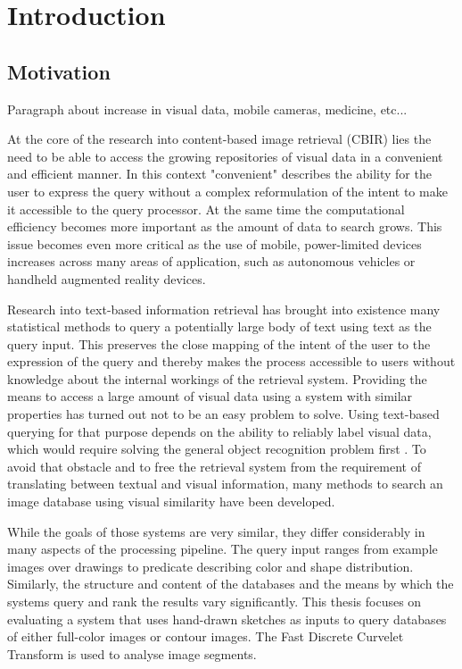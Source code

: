 \chapter{Introduction}\label{ch:introduction}

\section{Motivation}

Paragraph about increase in visual data, mobile cameras, medicine, etc...

At the core of the research into content-based image retrieval (CBIR) lies the
need to be able to access the growing repositories of visual data in a
convenient and efficient manner.  In this context "convenient" describes the
ability for the user to express the query without a complex reformulation of
the intent to make it accessible to the query processor. At the same time the
computational efficiency becomes more important as the amount of data to search
grows. This issue becomes even more critical as the use of mobile,
power-limited devices increases across many areas of application, such as
autonomous vehicles or handheld augmented reality devices.

Research into text-based information retrieval has brought into existence many
statistical methods to query a potentially large body of text using text as the
query input. This preserves the close mapping of the intent of the user to the
expression of the query and thereby makes the process accessible to users
without knowledge about the internal workings of the retrieval system.
Providing the means to access a large amount of visual data using a system with
similar properties has turned out not to be an easy problem to solve. Using
text-based querying for that purpose depends on the ability to reliably label
visual data, which would require solving the general object recognition problem
first \autocite{smeulders_content-based_2000}. To avoid that obstacle and to
free the retrieval system from the requirement of translating between textual
and visual information, many methods to search an image database using visual
similarity have been developed.

While the goals of those systems are very similar, they differ considerably in
many aspects of the processing pipeline. The query input ranges from example
images over drawings to predicate describing color and shape distribution.
Similarly, the structure and content of the databases and the means by which
the systems query and rank the results vary significantly. This thesis focuses
on evaluating a system that uses hand-drawn sketches as inputs to query
databases of either full-color images or contour images. The Fast Discrete
Curvelet Transform \autocite{candes_fast_2006} is used to analyse image
segments.

